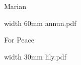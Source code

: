 \centerline{\useimageresource \lastsavedimageresourceindex}



\eject

\beginpart Marian


\bigskip



\paginaproxima

%


%




\bigskip




\eject


\paginaproxima



\paginaproxima


\paginaproxima


\paginaproxima




\bigskip

\saveimageresource width 60mm {annun.pdf}

\centerline{\useimageresource \lastsavedimageresourceindex}




\eject

\beginpart For Peace



\paginaproxima


\bigskip



\bigskip

\saveimageresource width 30mm {lily.pdf}

